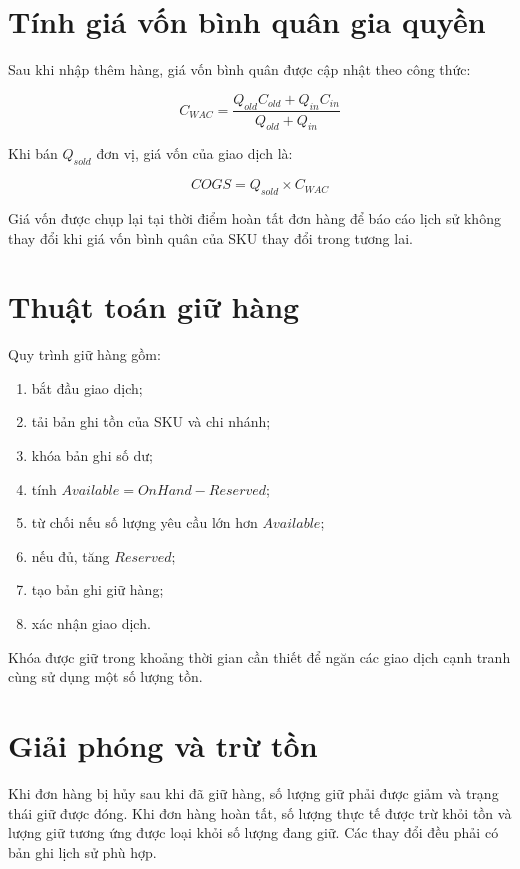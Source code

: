 \section{Tính giá vốn bình quân gia quyền}

Sau khi nhập thêm hàng, giá vốn bình quân được cập nhật theo công thức:

\[
C_{WAC} =
\frac{Q_{old}C_{old} + Q_{in}C_{in}}
     {Q_{old}+Q_{in}}
\]

Khi bán $Q_{sold}$ đơn vị, giá vốn của giao dịch là:

\[
COGS = Q_{sold} \times C_{WAC}
\]

Giá vốn được chụp lại tại thời điểm hoàn tất đơn hàng để báo cáo lịch sử không thay đổi khi
giá vốn bình quân của SKU thay đổi trong tương lai.

\section{Thuật toán giữ hàng}

Quy trình giữ hàng gồm:

\begin{enumerate}
    \item bắt đầu giao dịch;
    \item tải bản ghi tồn của SKU và chi nhánh;
    \item khóa bản ghi số dư;
    \item tính $Available = OnHand - Reserved$;
    \item từ chối nếu số lượng yêu cầu lớn hơn $Available$;
    \item nếu đủ, tăng $Reserved$;
    \item tạo bản ghi giữ hàng;
    \item xác nhận giao dịch.
\end{enumerate}

Khóa được giữ trong khoảng thời gian cần thiết để ngăn các giao dịch cạnh tranh cùng sử dụng
một số lượng tồn.

\section{Giải phóng và trừ tồn}

Khi đơn hàng bị hủy sau khi đã giữ hàng, số lượng giữ phải được giảm và trạng thái giữ được
đóng. Khi đơn hàng hoàn tất, số lượng thực tế được trừ khỏi tồn và lượng giữ tương ứng được
loại khỏi số lượng đang giữ. Các thay đổi đều phải có bản ghi lịch sử phù hợp.

